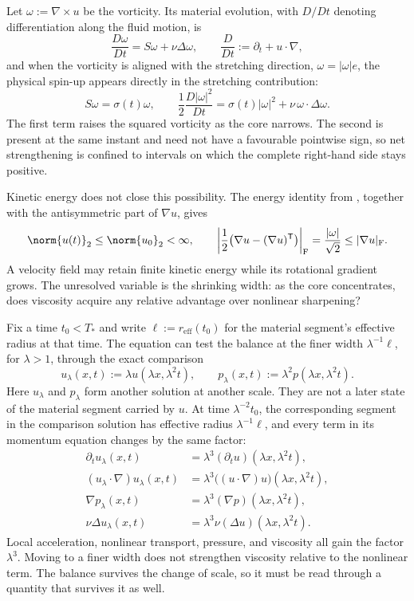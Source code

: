 Let \(\omega:=\nabla\times u\) be the vorticity. Its material evolution, with \(D/Dt\) denoting differentiation along the fluid motion, is
\[
  \frac{D\omega}{Dt}
  =
  S\omega+\nu\Delta\omega,
  \qquad
  \frac{D}{Dt}
  :=
  \partial_t+u\cdot\nabla,
\]
and when the vorticity is aligned with the stretching direction, \(\omega=|\omega|e\), the physical spin-up appears directly in the stretching contribution:
\[
  S\omega
  =
  \sigma(t)\omega,
  \qquad
  \frac12\frac{D|\omega|^2}{Dt}
  =
  \sigma(t)|\omega|^2
  +
  \nu\,\omega\cdot\Delta\omega.
\]
The first term raises the squared vorticity as the core narrows. The second is present at the same instant and need not have a favourable pointwise sign, so net strengthening is confined to intervals on which the complete right-hand side stays positive.

Kinetic energy does not close this possibility. The energy identity from , together with the antisymmetric part of \(\nabla u\), gives
\[
  \norm{u(t)}_2
  \leq
  \norm{u_0}_2
  <\infty,
  \qquad
  \left|\frac12\bigl(\nabla u-(\nabla u)^{\mathsf T}\bigr)\right|_{\mathrm F}
  =
  \frac{|\omega|}{\sqrt2}
  \leq
  |\nabla u|_{\mathrm F}.
\]
A velocity field may retain finite kinetic energy while its rotational gradient grows. The unresolved variable is the shrinking width: as the core concentrates, does viscosity acquire any relative advantage over nonlinear sharpening?


Fix a time \(t_0<T_*\) and write \(\ell:=r_{\mathrm{eff}}(t_0)\) for the material segment's effective radius at that time. The equation can test the balance at the finer width \(\lambda^{-1}\ell\), for \(\lambda>1\), through the exact comparison
\[
  u_\lambda(x,t)
  :=
  \lambda u(\lambda x,\lambda^2t),
  \qquad
  p_\lambda(x,t)
  :=
  \lambda^2p(\lambda x,\lambda^2t).
\]
Here \(u_\lambda\) and \(p_\lambda\) form another solution at another scale. They are not a later state of the material segment carried by \(u\). At time \(\lambda^{-2}t_0\), the corresponding segment in the comparison solution has effective radius \(\lambda^{-1}\ell\), and every term in its momentum equation changes by the same factor:
\[
\begin{aligned}
  \partial_tu_\lambda(x,t)
  &=
  \lambda^3(\partial_tu)(\lambda x,\lambda^2t),
  \\
  (u_\lambda\cdot\nabla)u_\lambda(x,t)
  &=
  \lambda^3\bigl((u\cdot\nabla)u\bigr)(\lambda x,\lambda^2t),
  \\
  \nabla p_\lambda(x,t)
  &=
  \lambda^3(\nabla p)(\lambda x,\lambda^2t),
  \\
  \nu\Delta u_\lambda(x,t)
  &=
  \lambda^3\nu(\Delta u)(\lambda x,\lambda^2t).
\end{aligned}
\]
Local acceleration, nonlinear transport, pressure, and viscosity all gain the factor \(\lambda^3\). Moving to a finer width does not strengthen viscosity relative to the nonlinear term. The balance survives the change of scale, so it must be read through a quantity that survives it as well.


